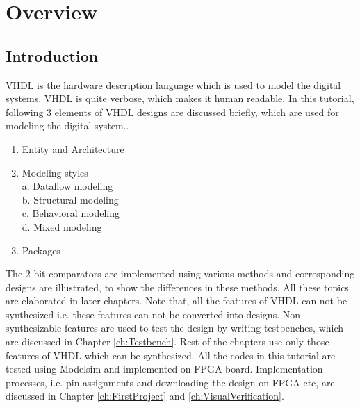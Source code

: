 \chapter{Overview} \label{ch:OverView}

\graphicspath{{Chapters/Overview/Figures/}}


%
%
%

\section{Introduction}
VHDL is the hardware description language which is used to model the digital systems. VHDL is quite verbose, which makes it human readable. In this tutorial, following 3 elements of VHDL designs are discussed briefly, which are used for modeling the digital system.. 
\begin{enumerate}
	\item Entity and Architecture
	\item Modeling styles\\
	a. Dataflow modeling\\
	b. Structural modeling\\
	c. Behavioral modeling\\
	d. Mixed modeling
	\item Packages
\end{enumerate}

The 2-bit comparators are implemented using various methods and corresponding designs are illustrated, to show the differences in these methods. All these topics are elaborated in later chapters. Note that, all the features of VHDL can not be synthesized i.e. these features can not be converted into designs. Non-synthesizable features are used to test the design by writing testbenches, which are discussed in Chapter \ref{ch:Testbench}. Rest of the chapters use only those features of VHDL which can be synthesized. All the codes in this tutorial are tested using Modelsim and implemented on FPGA board. Implementation processes, i.e. pin-assignments and downloading the design on FPGA etc, are discussed in Chapter \ref{ch:FirstProject} and \ref{ch:VisualVerification}.
%

